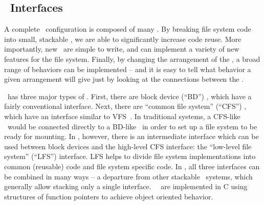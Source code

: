 \subsection {\Module\ Interfaces}
\label{sec:design:interfaces}

A complete \Kudos\ configuration is composed of many \modules. By breaking file
system code into small, stackable \modules, we are able to significantly
increase code reuse. More importantly, new \modules\ are simple to write, and
can implement a variety of new features for the file system. Finally, by
changing the arrangement of the \modules, a broad range of behaviors can be
implemented -- and it is easy to tell what behavior a given arrangement will
give just by looking at the connections between the \modules.

\Kudos\ has three major types of \modules. First, there are block device
(``BD'') \modules, which have a fairly conventional interface. Next, there are
``common file system'' (``CFS'') \modules, which have an interface similar to
VFS~\cite{kleiman86vnodes}. In traditional systems, a CFS-like \module\ would be
connected directly to a BD-like \module\ in order to set up a file system to be
ready for mounting. In \Kudos, however, there is an intermediate interface which
can be used between block devices and the high-level CFS interface: the
``low-level file system'' (``LFS'') interface. LFS helps to divide file system
implementations into common (reusable) code and file system specific code. In
\Kudos, all three interfaces can be combined in many ways -- a departure from
other stackable \module\ systems, which generally allow stacking only a single
interface. \Kudos\ \modules\ are implemented in C using structures of function
pointers to achieve object oriented behavior.

